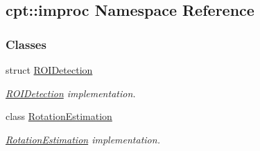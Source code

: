 \hypertarget{namespacecpt_1_1improc}{\subsection{cpt\-:\-:improc Namespace Reference}
\label{namespacecpt_1_1improc}
}
\subsubsection*{Classes}
\begin{DoxyCompactItemize}
\item 
struct \hyperlink{structcpt_1_1improc_1_1_r_o_i_detection}{R\-O\-I\-Detection}
\begin{DoxyCompactList}\small\item\em \hyperlink{structcpt_1_1improc_1_1_r_o_i_detection}{R\-O\-I\-Detection} implementation. \end{DoxyCompactList}\item 
class \hyperlink{classcpt_1_1improc_1_1_rotation_estimation}{Rotation\-Estimation}
\begin{DoxyCompactList}\small\item\em \hyperlink{classcpt_1_1improc_1_1_rotation_estimation}{Rotation\-Estimation} implementation. \end{DoxyCompactList}\end{DoxyCompactItemize}
